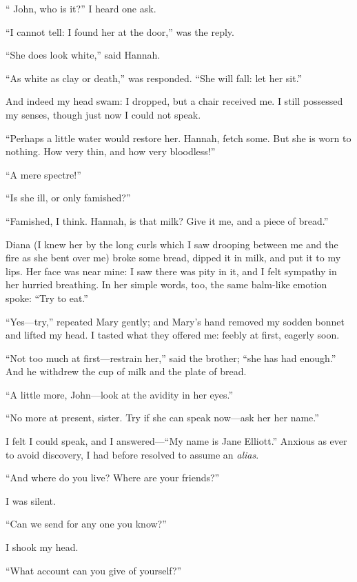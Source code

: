\enquote{\St{} John, who is it?} I heard one ask.

\enquote{I cannot tell: I found her at the door,} was the reply.

\enquote{She does look white,} said Hannah.

\enquote{As white as clay or death,} was responded. \enquote{She will
fall: let her sit.}

And indeed my head swam: I dropped, but a chair received me. I still
possessed my senses, though just now I could not speak.

\enquote{Perhaps a little water would restore her. Hannah, fetch some. 
But she is worn to nothing. How very thin, and how very bloodless!}

\enquote{A mere spectre!}

\enquote{Is she ill, or only famished?}

\enquote{Famished, I think. Hannah, is that milk? Give it me, and a
piece of bread.}

Diana (I knew her by the long curls which I saw drooping between me and
the fire as she bent over me) broke some bread, dipped it in milk, and
put it to my lips. Her face was near mine: I saw there was pity in it,
and I felt sympathy in her hurried breathing. In her simple words, too,
the same balm-like emotion spoke: \enquote{Try to eat.}

\enquote{Yes---try,} repeated Mary gently; and Mary's hand removed my
sodden bonnet and lifted my head. I tasted what they offered me: feebly
at first, eagerly soon.

\enquote{Not too much at first---restrain her,} said the brother;
\enquote{she has had enough.} And he withdrew the cup of milk and the
plate of bread.

\enquote{A little more, \St{} John---look at the avidity in her eyes.}

\enquote{No more at present, sister. Try if she can speak now---ask her
her name.}

I felt I could speak, and I answered---\enquote{My name is Jane
Elliott.} Anxious as ever to avoid discovery, I had before resolved to
assume an \emph{alias}.

\enquote{And where do you live? Where are your friends?}

I was silent.

\enquote{Can we send for any one you know?}

I shook my head.

\enquote{What account can you give of yourself?}

